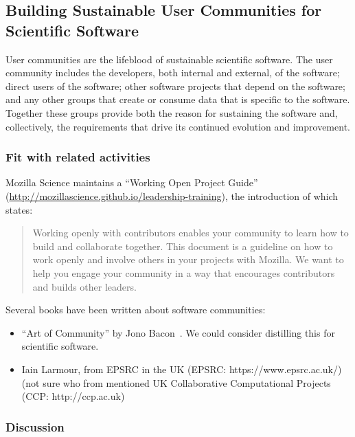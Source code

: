 \subsection{Building Sustainable User Communities for Scientific Software}


User communities are the lifeblood of sustainable scientific software. The user community includes the developers, 
both internal and external, of the software; direct users of the software; other software projects that depend on
the software; and any other groups that create or consume data that is specific to the software. Together these
groups provide both the reason for sustaining the software and, collectively, the requirements that drive its continued
evolution and improvement.

\subsubsection{Fit with related activities}

Mozilla Science maintains a ``Working Open Project Guide'' (\url{http://mozillascience.github.io/leadership-training}), the introduction of which states: 
\begin{quote}
Working openly with contributors enables your
    community to learn how to build and collaborate together. This
    document is a guideline on how to work openly and involve others
    in your projects with Mozilla. We want to help you engage your
    community in a way that encourages contributors and builds other
    leaders.
 \end{quote}

Several books have been written about software communities:
\begin{itemize}
\item ``Art of Community'' by Jono Bacon~\cite{art-of-community}. We could consider distilling this for scientific software.
\item Iain Larmour, from EPSRC in the UK (EPSRC: https://www.epsrc.ac.uk/) (not sure who from mentioned UK Collaborative Computational Projects (CCP: http://ccp.ac.uk)
\end{itemize}

\subsubsection{Discussion}

